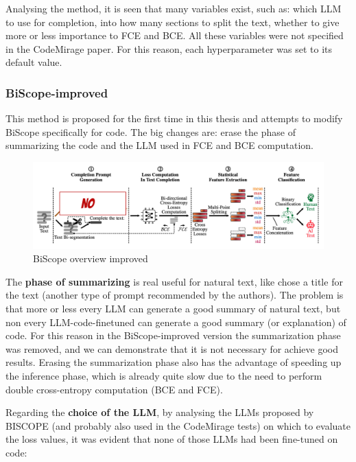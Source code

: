 Analysing the method, it is seen that many variables exist, such as: 
which LLM to use for completion, into how many sections to split 
the text, whether to give more or less importance to FCE and BCE. 
All these variables were not specified in the CodeMirage paper. 
For this reason, each hyperparameter was set to its default value.

\clearpage
\subsubsection{BiScope-improved}
This method is proposed for the first time in this thesis and attempts to modify BiScope specifically for code.
The big changes are: erase the phase of summarizing the code and the LLM used
in FCE and BCE computation.

\begin{figure}[H]
    \centering
    \includegraphics[width=1\textwidth]{img/BiScope/overview improved.jpg}
    \caption{BiScope overview improved}
    \label{fig:BiScope-overview-improved}
\end{figure}

The \textbf{phase of summarizing} is real useful for natural text, like chose
a title for the text (another type of prompt recommended by the authors).
The problem is that more or less every LLM can generate a good summary of
natural text, but non every LLM-code-finetuned can generate a good summary 
(or explanation) of code.
For this reason in the BiScope-improved version the summarization 
phase was removed, and we can demonstrate that it is not necessary for
achieve good results.
Erasing the summarization phase also has the advantage of speeding up
the inference phase, which is already quite slow due to the need to
perform double cross-entropy computation (BCE and FCE).

Regarding the \textbf{choice of the LLM}, 
by analysing the LLMs proposed by BISCOPE (and probably also used in the 
CodeMirage tests) on which to evaluate the loss values, it was evident 
that none of those LLMs had been fine-tuned on code:

